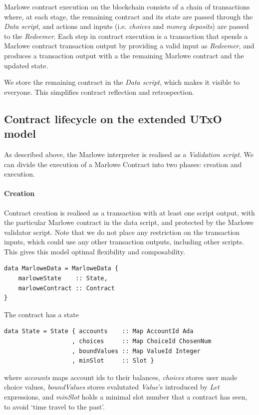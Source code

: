\documentclass[runningheads]{llncs}
\begin{document}
\noindent
Marlowe contract execution on the blockchain consists of a chain of transactions
where, at each stage, the remaining contract and its state are passed through the \emph{Data script},
and actions and inputs (i.e. \emph{choices} and \emph{money deposits}) are passed to the %
\emph{Redeemer}.
Each step in contract execution is a transaction that spends a Marlowe contract transaction output
by providing a valid input as \emph{Redeemer}, and produces a transaction output
with a the remaining Marlowe contract and the updated state.

We store the remaining contract in the \emph{Data script}, which makes it visible to everyone.
This simplifies contract reflection and retrospection.

\subsection{Contract lifecycle on the extended UTxO model}

As described above, the Marlowe interpreter is realised as a \emph{Validation script}.
We can divide the execution of a Marlowe Contract into two phases:
creation and execution.

\paragraph{Creation}

Contract creation is realised as a transaction
with at least one script output,
with the particular Marlowe contract in the data script, and protected by the Marlowe validator script.
Note that we do not place any restriction on the transaction inputs, which could use any other transaction
outputs, including other scripts. This gives this model optimal flexibility and composability.

\begin{verbatim}
data MarloweData = MarloweData {
    marloweState    :: State,
    marloweContract :: Contract
}
\end{verbatim}
\noindent
The contract has a state

\begin{verbatim}
data State = State { accounts    :: Map AccountId Ada
                   , choices     :: Map ChoiceId ChosenNum
                   , boundValues :: Map ValueId Integer
                   , minSlot     :: Slot }
\end{verbatim}

\noindent%
where \emph{accounts} maps account ids to their balances, \emph{choices} stores user made choice values,
\emph{boundValues} stores evalutated \emph{Value}'s introduced by \emph{Let} expressions,
and \emph{minSlot} holds a minimal slot number that a contract has seen, to avoid `time travel to the past'.
\end{document}
